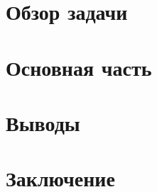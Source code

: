 \documentclass[a4paper,14pt]{extarticle}
\begin{document}
    \newpage
    \section{Обзор задачи}
        
    \section{Основная часть}
    
    \section{Выводы}
    
    \section{Заключение}
    
    
    \newrefcontext[sorting=none]
    \printbibliography[heading=bibnumbered]
\end{document}
